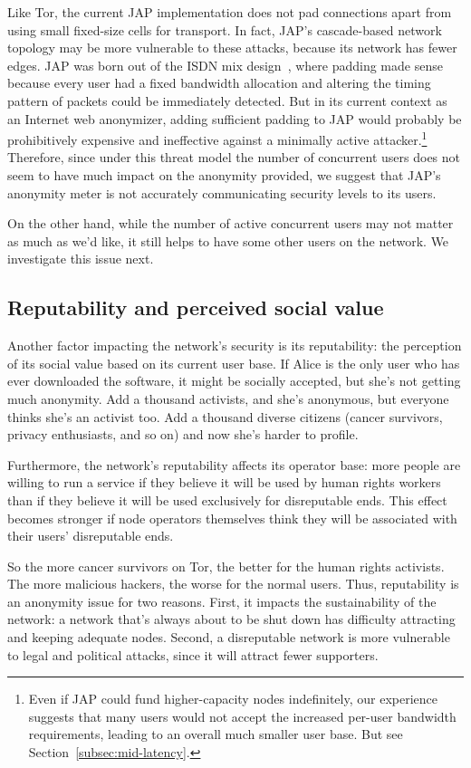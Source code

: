 \documentclass{llncs}
\begin{document}
Like Tor, the current JAP implementation does not pad connections
apart from using small fixed-size cells for transport. In fact,
JAP's cascade-based network topology may be more vulnerable to these
attacks, because its network has fewer edges. JAP was born out of
the ISDN mix design~\cite{isdn-mixes}, where padding made sense because
every user had a fixed bandwidth allocation and altering the timing
pattern of packets could be immediately detected. But in its current context
as an Internet web anonymizer, adding sufficient padding to JAP
would probably be prohibitively expensive and ineffective against a
minimally active attacker.\footnote{Even if JAP could
fund higher-capacity nodes indefinitely, our experience
suggests that many users would not accept the increased per-user
bandwidth requirements, leading to an overall much smaller user base. But
see Section~\ref{subsec:mid-latency}.} Therefore, since under this threat
model the number of concurrent users does not seem to have much impact
on the anonymity provided, we suggest that JAP's anonymity meter is not
accurately communicating security levels to its users.

On the other hand, while the number of active concurrent users may not
matter as much as we'd like, it still helps to have some other users
on the network. We investigate this issue next.

\subsection{Reputability and perceived social value}
Another factor impacting the network's security is its reputability:
the perception of its social value based on its current user base. If Alice is
the only user who has ever downloaded the software, it might be socially
accepted, but she's not getting much anonymity. Add a thousand
activists, and she's anonymous, but everyone thinks she's an activist too.
Add a thousand
diverse citizens (cancer survivors, privacy enthusiasts, and so on)
and now she's harder to profile.

Furthermore, the network's reputability affects its operator base: more people
are willing to run a service if they believe it will be used by human rights
workers than if they believe it will be used exclusively for disreputable
ends.  This effect becomes stronger if node operators themselves think they
will be associated with their users' disreputable ends.

So the more cancer survivors on Tor, the better for the human rights
activists. The more malicious hackers, the worse for the normal users. Thus,
reputability is an anonymity issue for two reasons. First, it impacts
the sustainability of the network: a network that's always about to be
shut down has difficulty attracting and keeping adequate nodes.
Second, a disreputable network is more vulnerable to legal and
political attacks, since it will attract fewer supporters.
\end{document}
